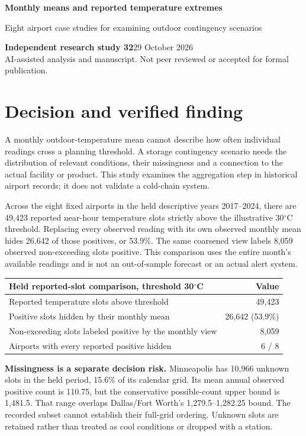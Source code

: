 \documentclass[10pt,letterpaper]{article}
\begin{document}
\color{ink}
{\LARGE\bfseries Monthly means and reported temperature extremes\par}
{\large Eight airport case studies for examining outdoor contingency scenarios\par}
\textbf{Independent research study 32}\hfill29 October 2026\\
AI-assisted analysis and manuscript. Not peer reviewed or accepted for formal publication.

\section*{Decision and verified finding}
A monthly outdoor-temperature mean cannot describe how often individual readings cross a planning threshold. A storage contingency scenario needs the distribution of relevant conditions, their missingness and a connection to the actual facility or product. This study examines the aggregation step in historical airport records; it does not validate a cold-chain system.

Across the eight fixed airports in the held descriptive years 2017--2024, there are 49,423 reported near-hour temperature slots strictly above the illustrative 30$^{\circ}$C threshold. Replacing every observed reading with its own observed monthly mean hides 26,642 of those positives, or 53.9\%. The same coarsened view labels 8,059 observed non-exceeding slots positive. This comparison uses the entire month's available readings and is not an out-of-sample forecast or an actual alert system.

\begin{center}\begin{tabularx}{\linewidth}{Xr}\toprule
Held reported-slot comparison, threshold 30$^{\circ}$C & Value\\\midrule
Reported temperature slots above threshold & 49,423\\
Positive slots hidden by their monthly mean & 26,642 (53.9\%)\\
Non-exceeding slots labeled positive by the monthly view & 8,059\\
Airports with every reported positive hidden & 6 / 8\\\bottomrule
\end{tabularx}\end{center}

\textbf{Missingness is a separate decision risk.} Minneapolis has 10,966 unknown slots in the held period, 15.6\% of its calendar grid. Its mean annual observed positive count is 110.75, but the conservative possible-count upper bound is 1,481.5. That range overlaps Dallas/Fort Worth's 1,279.5--1,282.25 bound. The recorded subset cannot establish their full-grid ordering. Unknown slots are retained rather than treated as cool conditions or dropped with a station.
\end{document}
